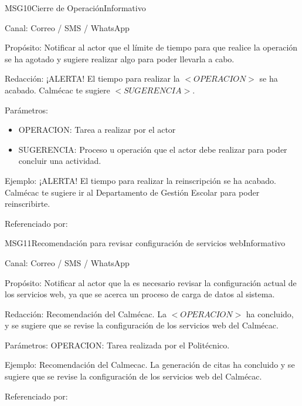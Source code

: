 \begin{mensaje}{MSG10}{Cierre de Operación}{Informativo}
	\item[Canal:] Correo / SMS / WhatsApp
	\item[Propósito:] Notificar al actor que el límite de tiempo para que realice la operación se ha agotado y sugiere realizar algo para poder llevarla a cabo.
	\item[Redacción:] ¡ALERTA! El tiempo para realizar la $<OPERACION>$ se ha acabado. Calmécac te sugiere $<SUGERENCIA>$.
	\item[Parámetros:] 
	\begin{itemize}
		\item OPERACION: Tarea a realizar por el actor
		\item SUGERENCIA: Proceso u operación que el actor debe realizar para poder concluir una actividad.
	\end{itemize}
	\item[Ejemplo:] ¡ALERTA! El tiempo para realizar la reinscripción se ha acabado. Calmécac te sugiere ir al Departamento de Gestión Escolar para poder reinscribirte.
	\item[Referenciado por: ] 
\end{mensaje}

\begin{mensaje}{MSG11}{Recomendación para revisar configuración de servicios web}{Informativo}
	\item[Canal:] Correo / SMS / WhatsApp
	\item[Propósito:] Notificar al actor que la es necesario revisar la configuración actual de los servicios web, ya que se acerca un proceso de carga de datos al sistema.
	\item[Redacción:] Recomendación del Calmécac. La $<OPERACION>$ ha concluido, y se sugiere que se revise la configuración de los servicios web del Calmécac.
	\item[Parámetros:] OPERACION: Tarea realizada por el Politécnico.
	\item[Ejemplo:] Recomendación del Calmecac. La generación de citas ha concluido y se sugiere que se revise la configuración de los servicios web del Calmécac.
	\item[Referenciado por: ] 	
\end{mensaje}


